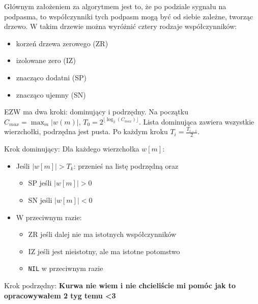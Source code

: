 \documentclass{../konspekt}
\begin{document}
\begin{multicols}{2}
  Głównym założeniem za algorytmem jest to, że po podziale sygnału na
  podpasma, to współczynniki tych podpasm mogą być od siebie zależne, tworząc
  drzewo. W takim drzewie można wyróżnić cztery rodzaje współczynników:
  \begin{itemize}
    \item korzeń drzewa zerowego (ZR)
    \item izolowane zero (IZ)
    \item znacząco dodatni (SP)
    \item znacząco ujemny (SN)
  \end{itemize}

  EZW ma dwa kroki: dominujący i podrzędny. Na początku $C_{max} =
  \max_m |w(m)|$,
  $T_0 = 2^{\lfloor \log_2(C_{max})\rfloor}$. Lista dominująca zawiera wszystkie
  wierzchołki, podrzędna jest pusta. Po każdym kroku $T_i = \frac{T_{i-1}}{2}$.

  Krok dominujący: Dla każdego wierzchołka $w[m]$:
  \begin{itemize}
    \item Jeśli $|w[m]| > T_k$:
      przenieś na listę podrzędną oraz
      \begin{itemize}
        \item SP jeśli $|w[m]| > 0$
        \item SN jeśli $|w[m]| < 0$
      \end{itemize}
    \item W przeciwnym razie:
      \begin{itemize}
        \item ZR jeśli dalej nie ma istotnych współczynników
        \item IZ jeśli jest nieistotny, ale ma istotne potomstwo
        \item \texttt{NIL} w przeciwnym razie
      \end{itemize}
  \end{itemize}

  Krok podrzędny:
  \textbf{Kurwa nie wiem i nie chcieliście mi pomóc jak to
  opracowywałem 2 tyg temu <3}

\end{multicols}
\end{document}
